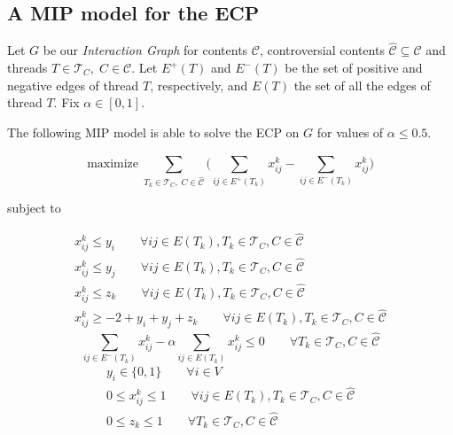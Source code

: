 \subsection{A MIP model for the \acrshort{ECP}}%
\label{sub:a_mip_model_for_the_ecp}

Let $G$ be our \emph{Interaction Graph} for contents $\mathcal{C} $,
controversial contents $\mathcal{\hat{C}} \subseteq \mathcal{C} $ and
threads $T \in \mathcal{T}_{C}, \; C \in \mathcal{C} $. Let $E^{+}(T) $
and $E^{-}(T ) $ be the set of positive and negative edges of thread $T$,
respectively, and $E(T)$ the set of all the edges of thread $T$. Fix $\alpha \in [0, 1]$.

The following \acrshort{MIP} model is able to solve the \acrshort{ECP} on $G$
for values of $\alpha \leq 0.5$.
%

\begin{equation}
	\label{eq:ecp-exact1}
	\text{maximize} \; \sum_{ T_{k} \in \mathcal{T}_{C}, \; C \in
		\mathcal{\hat{C}} } \big( \sum^{}_{ij \in E^{+} (T_{k})} x_{ij}
		^{k} - \sum_{ij \in E^{-} (T_{k})} x_{ij} ^{k} \big)
\end{equation} \begin{center} subject to \end{center}
\begin{gather}
	\label{eq:ecp-v1}
	x _{ij}^{k}  \leq y_i \quad\quad \forall ij \in E(T_{k}), T_{k} \in
	\mathcal{T}_{C}, C \in \mathcal{\hat{C}} \\
	\label{eq:ecp-v2}
	x _{ij}^{k}  \leq y_j \quad\quad \forall ij \in E(T_{k}), T_{k} \in
	\mathcal{T}_{C}, C \in \mathcal{\hat{C}} \\
	\label{eq:ecp-t1}
	x _{ij}^{k}  \leq z_k \quad\quad \forall ij \in E(T_{k}), T_{k} \in
	\mathcal{T}_{C}, C \in \mathcal{\hat{C}} \\
	\label{eq:ecp-e1}
	x _{ij} ^{k} \geq - 2 + y_i + y_j + z_k \quad\quad \forall ij \in E(T_k), T_k \in \mathcal{T} _{C}, C \in \hat{\mathcal{C} }
\end{gather}
\begin{equation}
	\label{eq:ecp-alpha-constraint1}
	\sum^{}_{ij \in E^{-} (T_k)} x_{ij}^{k}  - \alpha \sum^{}_{ij \in E(T_k)}
	x_{ij} ^{k}  \leq 0 \quad\quad \forall T_{k} \in \mathcal{T} _{C}, C \in
	\hat{\mathcal{C}}
\end{equation}
\begin{gather}
	\label{eq:ecp-vertex-def1}
	y _{i} \in  \{0, 1\} \quad\quad \forall i \in V \\
	\label{eq:ecp-edge-def1}
	0 \leq x _{ij} ^{k}  \leq 1 \quad\quad \forall ij \in E(T_{k}), T_{k} \in
	\mathcal{T}_{C}, C \in \mathcal{\hat{C}} \\
	\label{eq:ecp-thread-def1}
	0 \leq z _{k} \leq 1 \quad\quad \forall T_{k} \in \mathcal{T} _{C}, C \in
	\hat{\mathcal{C}}
\end{gather}

